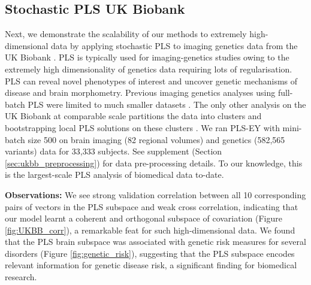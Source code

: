 \subsection{Stochastic PLS UK Biobank}
Next, we demonstrate the scalability of our methods to extremely high-dimensional data by applying stochastic PLS to imaging genetics data from the UK Biobank \citep{sudlow2015uk}.
PLS is typically used for imaging-genetics studies owing to the extremely high dimensionality of genetics data requiring lots of regularisation.
PLS can reveal novel phenotypes of interest and uncover genetic mechanisms of disease and brain morphometry.
Previous imaging genetics analyses using full-batch PLS were limited to much smaller datasets \citep{Lorenzi2018,Taquet2021,Lefloch2012}.
The only other analysis on the UK Biobank at comparable scale partitions the data into clusters and bootstrapping local PLS solutions on these clusters \citep{lorenzi2017secure, altmann2023tackling}.
We ran PLS-EY with mini-batch size 500 on brain imaging (82 regional volumes) and genetics (582,565 variants) data for 33,333 subjects. See supplement (Section \ref{sec:ukbb_preprocessing}) for data pre-processing details.
To our knowledge, this is the largest-scale PLS analysis of biomedical data to-date.

\textbf{Observations:} We see strong validation correlation between all 10 corresponding pairs of vectors in the PLS subspace and weak cross correlation, indicating that our model learnt a coherent and orthogonal subspace of covariation (Figure \ref{fig:UKBB_corr}), a remarkable feat for such high-dimensional data. We found that the PLS brain subspace was associated with genetic risk measures for several disorders (Figure \ref{fig:genetic_risk}), suggesting that the PLS subspace encodes relevant information for genetic disease risk, a significant finding for biomedical research.

